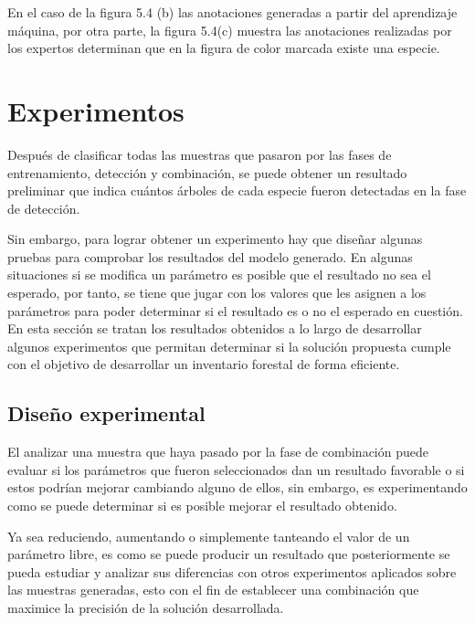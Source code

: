 En el caso de la figura 5.4 (b) las anotaciones generadas a partir del aprendizaje máquina, por otra parte, la figura 5.4(c) muestra  las anotaciones realizadas por los expertos determinan que en la figura de color marcada existe una especie.

\chapter{Experimentos}
Después de clasificar todas las muestras que pasaron por las fases de entrenamiento, detección y combinación, se puede obtener un resultado preliminar que indica  cuántos árboles de cada especie fueron detectadas en la fase de detección.

Sin embargo, para lograr obtener un experimento hay que diseñar algunas pruebas para comprobar los resultados del modelo generado. En algunas situaciones si se modifica un parámetro es posible que el resultado no sea el esperado, por tanto, se tiene que jugar con los valores que les asignen a los parámetros para poder determinar si el resultado es o no el esperado en cuestión. En esta sección se tratan los resultados obtenidos a lo largo de desarrollar algunos experimentos que permitan determinar si la solución propuesta cumple con el objetivo de desarrollar un inventario forestal de forma eficiente.
\newpage

\section{Diseño experimental}
El analizar una muestra que haya pasado por la fase de combinación puede evaluar si los parámetros que fueron seleccionados dan un resultado favorable o si estos podrían mejorar cambiando alguno de ellos, sin embargo, es experimentando como se puede determinar si es posible mejorar el resultado obtenido. 

Ya sea reduciendo, aumentando o simplemente tanteando el valor de un parámetro libre, es como se puede producir un resultado que posteriormente se pueda estudiar y analizar sus diferencias con otros experimentos aplicados sobre las muestras generadas, esto con el fin de establecer una combinación que maximice la precisión de la solución desarrollada.

